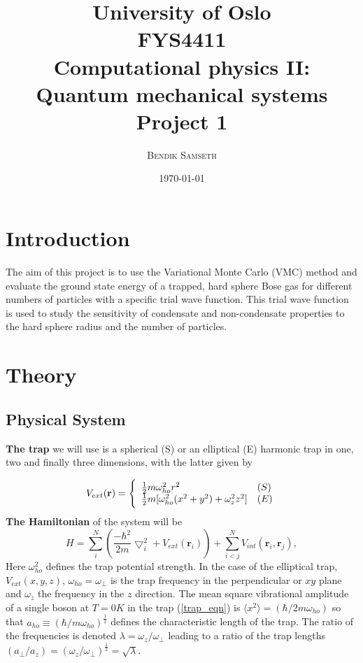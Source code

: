 \documentclass[twocolumn]{article}
\title{ \small
University of Oslo\\
FYS4411\\
Computational physics II: Quantum mechanical systems\\
\huge Project 1 }
\author{\textsc{Bendik Samseth}}
\date{\today}
\begin{document}
\maketitle


\section{Introduction}
The aim of this project is to use the Variational Monte Carlo
(VMC) method and evaluate the ground state energy of a trapped, hard
sphere Bose gas for different numbers of particles with a specific
trial wave function. This trial wave function is used to study the sensitivity of
condensate and non-condensate properties to the hard sphere radius
and the number of particles.  

\section{Theory}
\subsection{Physical System}
\textbf{The trap} we will use is a spherical (S)
or an elliptical (E) harmonic trap in one, two and finally three
dimensions, with the latter given by

\begin{equation}
    V_{ext}(\mathbf{r}) = 
    \Bigg\{
        \begin{array}{ll}
            \frac{1}{2}m\omega_{ho}^2r^2 & (S)\\
            \strut
            \frac{1}{2}m[\omega_{ho}^2(x^2+y^2) + \omega_z^2z^2] & (E)
            \label{trap_eqn}
        \end{array}
\end{equation}
\textbf{The Hamiltonian} of the system will be
\begin{equation}
    H = \sum_i^N \left(\frac{-\hbar^2}{2m}{\bigtriangledown }_{i}^2 +V_{ext}({\mathbf{r}}_i)\right)  +
     \sum_{i<j}^{N} V_{int}({\mathbf{r}}_i,{\mathbf{r}}_j),
\end{equation}
Here $\omega_{ho}^2$ defines the trap potential strength.  In the case of the
elliptical trap, $V_{ext}(x,y,z)$, $\omega_{ho}=\omega_{\perp}$ is the trap
frequency in the perpendicular or $xy$ plane and $\omega_z$ the frequency in
the $z$ direction.  The mean square vibrational amplitude of a single boson at
$T=0K$ in the trap (\ref{trap_eqn}) is $\langle
x^2\rangle=(\hbar/2m\omega_{ho})$ so that $a_{ho} \equiv
(\hbar/m\omega_{ho})^{\frac{1}{2}}$ defines the characteristic length of the
trap.  The ratio of the frequencies is denoted
$\lambda=\omega_z/\omega_{\perp}$ leading to a ratio of the trap lengths
$(a_{\perp}/a_z)=(\omega_z/\omega_{\perp})^{\frac{1}{2}} = \sqrt{\lambda}$.
\end{document}

